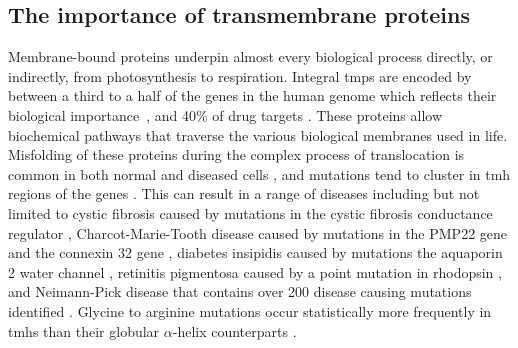 \subsection{The importance of transmembrane proteins}
Membrane-bound proteins underpin almost every biological process directly, or indirectly, from photosynthesis to respiration.
Integral \gls{tmp}s are encoded by between a third to a half of the genes in the human genome which reflects their biological importance~\cite{Hopkins2002, Almen2009, Wang2013}, and 40\% of drug targets \cite{Overington2006}.
These proteins allow biochemical pathways that traverse the various biological membranes used in life.
Misfolding of these proteins during the complex process of translocation is common in both normal and diseased cells \cite{Shurtleff2018}, and mutations tend to cluster in \gls{tmh} regions of the genes \cite{Sanders2004}.
This can result in a range of diseases including but not limited to cystic fibrosis caused by mutations in the cystic fibrosis conductance regulator \cite{Riordan1989}, Charcot\--Marie\--Tooth disease caused by mutations in the PMP22 gene \cite{Roa1993} and the connexin 32 gene \cite{Fairweather1994}, diabetes insipidis caused by mutations the aquaporin 2 water channel \cite{vanLieburg1994}, retinitis pigmentosa caused by a point mutation in rhodopsin \cite{Dryja1990}, and Neimann\--Pick disease that contains over 200 disease causing mutations identified \cite{Gelsthorpe2008, Park2003, Scott2004, Fernandez-Valero2005}.
Glycine to arginine mutations occur statistically more frequently in \gls{tmh}s than their globular $\alpha$\--helix counterparts \cite{Partridge2002}.




